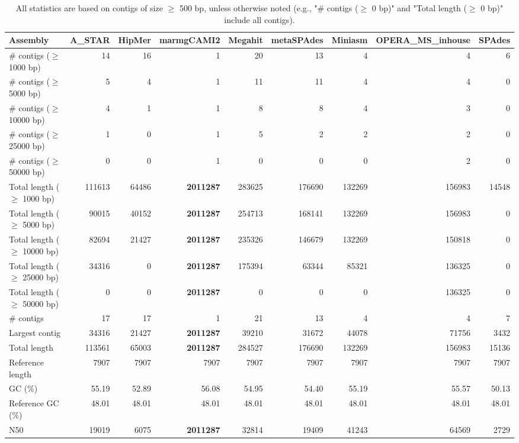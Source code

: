 \documentclass[12pt,a4paper]{article}
\begin{document}
\begin{table}[ht]
\begin{center}
\caption{All statistics are based on contigs of size $\geq$ 500 bp, unless otherwise noted (e.g., "\# contigs ($\geq$ 0 bp)" and "Total length ($\geq$ 0 bp)" include all contigs).}
\begin{tabular}{|l*{8}{|r}|}
\hline
Assembly & A\_STAR & HipMer & marmgCAMI2 & Megahit & metaSPAdes & Miniasm & OPERA\_MS\_inhouse & SPAdes \\ \hline
\# contigs ($\geq$ 1000 bp) & 14 & 16 & 1 & 20 & 13 & 4 & 4 & 6 \\ \hline
\# contigs ($\geq$ 5000 bp) & 5 & 4 & 1 & 11 & 11 & 4 & 4 & 0 \\ \hline
\# contigs ($\geq$ 10000 bp) & 4 & 1 & 1 & 8 & 8 & 4 & 3 & 0 \\ \hline
\# contigs ($\geq$ 25000 bp) & 1 & 0 & 1 & 5 & 2 & 2 & 2 & 0 \\ \hline
\# contigs ($\geq$ 50000 bp) & 0 & 0 & 1 & 0 & 0 & 0 & 2 & 0 \\ \hline
Total length ($\geq$ 1000 bp) & 111613 & 64486 & {\bf 2011287} & 283625 & 176690 & 132269 & 156983 & 14548 \\ \hline
Total length ($\geq$ 5000 bp) & 90015 & 40152 & {\bf 2011287} & 254713 & 168141 & 132269 & 156983 & 0 \\ \hline
Total length ($\geq$ 10000 bp) & 82694 & 21427 & {\bf 2011287} & 235326 & 146679 & 132269 & 150818 & 0 \\ \hline
Total length ($\geq$ 25000 bp) & 34316 & 0 & {\bf 2011287} & 175394 & 63344 & 85321 & 136325 & 0 \\ \hline
Total length ($\geq$ 50000 bp) & 0 & 0 & {\bf 2011287} & 0 & 0 & 0 & 136325 & 0 \\ \hline
\# contigs & 17 & 17 & 1 & 21 & 13 & 4 & 4 & 7 \\ \hline
Largest contig & 34316 & 21427 & {\bf 2011287} & 39210 & 31672 & 44078 & 71756 & 3432 \\ \hline
Total length & 113561 & 65003 & {\bf 2011287} & 284527 & 176690 & 132269 & 156983 & 15136 \\ \hline
Reference length & 7907 & 7907 & 7907 & 7907 & 7907 & 7907 & 7907 & 7907 \\ \hline
GC (\%) & 55.19 & 52.89 & 56.08 & 54.95 & 54.40 & 55.19 & 55.57 & 50.13 \\ \hline
Reference GC (\%) & 48.01 & 48.01 & 48.01 & 48.01 & 48.01 & 48.01 & 48.01 & 48.01 \\ \hline
N50 & 19019 & 6075 & {\bf 2011287} & 32814 & 19409 & 41243 & 64569 & 2729 \\ \hline

\end{tabular}
\end{center}
\end{table}
\end{document}
